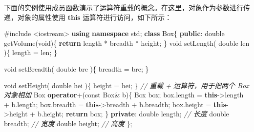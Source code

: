 \documentclass[
]{article}
\newenvironment{Shaded}{}{}
\newcommand{\AttributeTok}[1]{\textcolor[rgb]{0.49,0.56,0.16}{#1}}
\newcommand{\CommentTok}[1]{\textcolor[rgb]{0.38,0.63,0.69}{\textit{#1}}}
\newcommand{\ControlFlowTok}[1]{\textcolor[rgb]{0.00,0.44,0.13}{\textbf{#1}}}
\newcommand{\DataTypeTok}[1]{\textcolor[rgb]{0.56,0.13,0.00}{#1}}
\newcommand{\ImportTok}[1]{#1}
\newcommand{\KeywordTok}[1]{\textcolor[rgb]{0.00,0.44,0.13}{\textbf{#1}}}
\newcommand{\NormalTok}[1]{#1}
\newcommand{\OperatorTok}[1]{\textcolor[rgb]{0.40,0.40,0.40}{#1}}
\newcommand{\PreprocessorTok}[1]{\textcolor[rgb]{0.74,0.48,0.00}{#1}}
\begin{document}
下面的实例使用成员函数演示了运算符重载的概念。在这里，对象作为参数进行传递，对象的属性使用
\textbf{this} 运算符进行访问，如下所示：

\begin{Shaded}
\begin{Highlighting}[]
\PreprocessorTok{\#include }\ImportTok{\textless{}iostream\textgreater{}}
\KeywordTok{using} \KeywordTok{namespace}\NormalTok{ std}\OperatorTok{;}
\KeywordTok{class}\NormalTok{ Box}\OperatorTok{\{}
   \KeywordTok{public}\OperatorTok{:}
      \DataTypeTok{double}\NormalTok{ getVolume}\OperatorTok{(}\DataTypeTok{void}\OperatorTok{)\{}
         \ControlFlowTok{return}\NormalTok{ length }\OperatorTok{*}\NormalTok{ breadth }\OperatorTok{*}\NormalTok{ height}\OperatorTok{;}
      \OperatorTok{\}}
      \DataTypeTok{void}\NormalTok{ setLength}\OperatorTok{(} \DataTypeTok{double}\NormalTok{ len }\OperatorTok{)\{}
\NormalTok{          length }\OperatorTok{=}\NormalTok{ len}\OperatorTok{;}
      \OperatorTok{\}}

      \DataTypeTok{void}\NormalTok{ setBreadth}\OperatorTok{(} \DataTypeTok{double}\NormalTok{ bre }\OperatorTok{)\{}
\NormalTok{          breadth }\OperatorTok{=}\NormalTok{ bre}\OperatorTok{;}
      \OperatorTok{\}}

      \DataTypeTok{void}\NormalTok{ setHeight}\OperatorTok{(} \DataTypeTok{double}\NormalTok{ hei }\OperatorTok{)\{}
\NormalTok{          height }\OperatorTok{=}\NormalTok{ hei}\OperatorTok{;}
      \OperatorTok{\}}
      \CommentTok{// 重载 + 运算符，用于把两个 Box 对象相加}
\NormalTok{      Box }\KeywordTok{operator}\OperatorTok{+(}\AttributeTok{const}\NormalTok{ Box}\OperatorTok{\&}\NormalTok{ b}\OperatorTok{)\{}
\NormalTok{         Box box}\OperatorTok{;}
\NormalTok{         box}\OperatorTok{.}\NormalTok{length }\OperatorTok{=} \KeywordTok{this}\OperatorTok{{-}\textgreater{}}\NormalTok{length }\OperatorTok{+}\NormalTok{ b}\OperatorTok{.}\NormalTok{length}\OperatorTok{;}
\NormalTok{         box}\OperatorTok{.}\NormalTok{breadth }\OperatorTok{=} \KeywordTok{this}\OperatorTok{{-}\textgreater{}}\NormalTok{breadth }\OperatorTok{+}\NormalTok{ b}\OperatorTok{.}\NormalTok{breadth}\OperatorTok{;}
\NormalTok{         box}\OperatorTok{.}\NormalTok{height }\OperatorTok{=} \KeywordTok{this}\OperatorTok{{-}\textgreater{}}\NormalTok{height }\OperatorTok{+}\NormalTok{ b}\OperatorTok{.}\NormalTok{height}\OperatorTok{;}
         \ControlFlowTok{return}\NormalTok{ box}\OperatorTok{;}
      \OperatorTok{\}}
   \KeywordTok{private}\OperatorTok{:}
      \DataTypeTok{double}\NormalTok{ length}\OperatorTok{;}      \CommentTok{// 长度}
      \DataTypeTok{double}\NormalTok{ breadth}\OperatorTok{;}     \CommentTok{// 宽度}
      \DataTypeTok{double}\NormalTok{ height}\OperatorTok{;}      \CommentTok{// 高度}
\OperatorTok{\};}


\end{Highlighting}
\end{Shaded}
\end{document}
